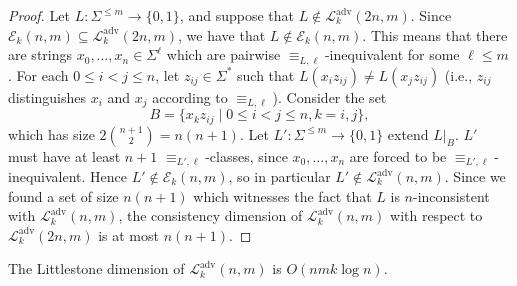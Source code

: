 \documentclass[runningheads]{llncs}
\newcommand{\mc}{\mathcal}
\begin{document}
\begin{proof}
    Let $L : \Sigma^{\leq m} \to \{0,1\}$, and suppose that $L \notin \mc L^{\text{adv}}_k(2n,m)$. 
    Since $\mc E_k(n,m) \subseteq \mc L^{\text{adv}}_k(2n,m)$, we have that $L \notin \mc E_k(n,m)$.
    This means that there are strings $x_0, \ldots, x_n \in \Sigma^\ell$ which are pairwise $\equiv_{L,\ell}$-inequivalent for some $\ell \leq m$. 
    For each $0 \leq i < j \leq n$, let $z_{ij} \in \Sigma^*$ such that $L(x_i z_{ij}) \neq L(x_j z_{ij})$ (i.e., $z_{ij}$ distinguishes $x_i$ and $x_j$ according to $\equiv_{L,\ell}$). 
    Consider the set 
    \[
        B = \{x_k z_{ij} \mid 0 \leq i < j \leq n, k = i,j\},
    \]
    which has size $2 \binom{n+1}{2} = n(n+1)$. 
    Let $L' : \Sigma^{\leq m} \to \{0,1\}$ extend $L|_B$.
    $L'$ must have at least $n+1$ $\equiv_{L',\ell}$-classes, since $x_0, \ldots, x_n$ are forced to be $\equiv_{L',\ell}$-inequivalent. 
    Hence $L' \notin \mc E_k(n,m)$, so in particular $L' \notin \mc L^{\text{adv}}_k(n,m)$.
    Since we found a set of size $n(n+1)$ which witnesses the fact that $L$ is $n$-inconsistent with $\mc L^{\text{adv}}_k(n,m)$, the consistency dimension of $\mc L^{\text{adv}}_k(n,m)$ with respect to $\mc L^{\text{adv}}_k(2n,m)$ is at most $n(n+1)$. 
\end{proof}

\begin{proposition} \label{prop:Ldim of DFAs with advice}
    The Littlestone dimension of $\mc L^{\text{adv}}_k(n,m)$ is $O(nmk \log n)$. 
\end{proposition}
\end{document}

